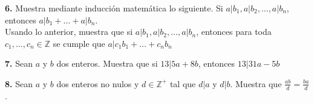 \documentclass[12pt]{article}
\begin{document}
\begin{enumerate}
\begin{enumerate}
    \end{enumerate}
\end{enumerate}

\vspace{1cm}

%
%
\textbf{6.} Muestra mediante inducción matemática lo siguiente. Si $a | b_1, a | b_2, \dots, a | b_n$, entonces $a | b_1 + \dots + a | b_n$.\\

Usando lo anterior, muestra que si $a | b_1, a | b_2, \dots, a | b_n$, entonces para toda $c_1, \dots, c_n \in \mathbb{Z}$ se cumple que $a | c_1b_1 + \dots + c_nb_n$
\vspace{1cm}

%
%
\textbf{7.} Sean $a$ y $b$ dos enteros. Muestra que si $13 | 5a + 8b$, entonces $13|31a - 5b$\\

\vspace{1cm}

%
%
\textbf{8.} Sean $a$ y $b$ dos enteros no nulos y $d \in \mathbb{Z}^+$ tal que $d | a$ y $d | b$. Muestra que $\frac{ab}{d} = \frac{ba}{d}$.

\vspace{1cm}
\end{document}
